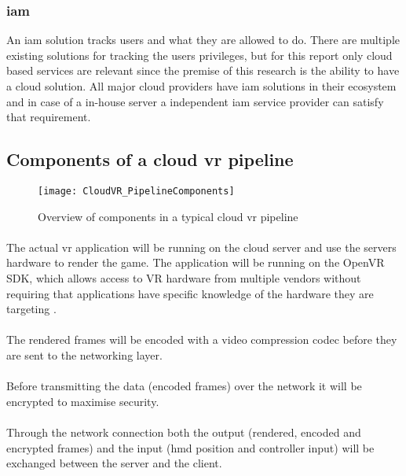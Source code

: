 \subsubsection{\acrfull{iam}}
An \acrshort{iam} solution tracks users and what they are allowed to do. There are multiple existing solutions for tracking the users privileges, but for this report only cloud based services are relevant since the premise of this research is the ability to have a cloud solution. All major cloud providers have \acrshort{iam} solutions in their ecosystem and in case of a in-house server a independent \acrshort{iam} service provider can satisfy that requirement.

\subsection{Components of a cloud \acrshort{vr} pipeline}

\begin{figure}[h]
\caption{Overview of components in a typical cloud \acrshort{vr} pipeline}
\label{fig:pipeline}
\texttt{[image: CloudVR\_PipelineComponents]}
\end{figure}

\paragraph{\textSR}
The actual \acrshort{vr} application will be running on the cloud server and use the servers hardware to render the game. The application will be running on the OpenVR SDK, which allows access to VR hardware from multiple vendors without requiring that applications have specific knowledge of the hardware they are targeting \parencite{openvrsdk}. 
\paragraph{\textSECO}
The rendered frames will be encoded with a video compression codec before they are sent to the networking layer.
\paragraph{\textSECR}
Before transmitting the data (encoded frames) over the network it will be encrypted to maximise security.
\paragraph{\textN}
Through the network connection both the output (rendered, encoded and encrypted frames) and the input (\acrshort{hmd} position and controller input) will be exchanged between the server and the client.

